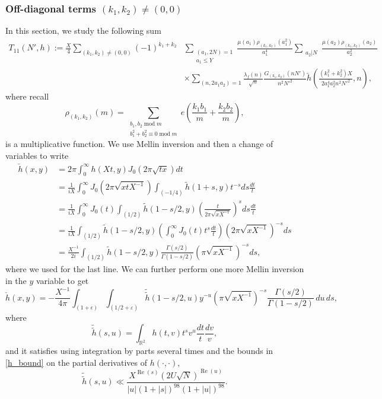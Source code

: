 \documentclass[12pt]{amsart}
\def\R{\mathbb R}
\def\R{\mathbb R}
\def\Re{\operatorname{Re}}
\def\mod{\operatorname{mod}}
\begin{document}
\subsubsection{Off-diagonal terms $(k_1,k_2)\not= (0,0)$}
In this section, we study the following sum
\begin{align*}
    T_{11}(N',h) :=\frac{X}{4}\sum_{(k_1,k_2)\not=(0,0)} (-1)^{k_1+k_2}&\sum_{\substack{(a_1,2N)=1\\a_1\leq Y}}\frac{\mu(a_1) \rho_{(k_1,k_2)}(a_1^2)}{a_1^4}\sum_{\substack{a_2|N}}\frac{\mu(a_2)\rho_{(k_1,k_2)}(a_2)}{a_2^2}\\
    &\times \sum_{(n,2a_1a_2)= 1}\frac{\lambda_f(n)} {\sqrt{n}} \frac{G_{(k_1,k_2)}(nN')}{n^2N'^2} \check{h}\left( \frac{(k_1^2+k_2^2)X}{2a_1^4a_2^2n^2N'^2} ,  n \right),
\end{align*}
where recall
$$ \rho_{(k_1,k_2)}(m)= \sum_{\substack{b_1,b_2 \mod m \\ b_1^2+b_2^2\equiv 0 \mod m}} e \left( \frac{k_1b_1}{m} + \frac{k_2 b_2}{m} \right), $$
is a multiplicative function.
We use Mellin inversion and then a change of variables to write
\begin{align*}
\check{h}(x,y) &= 2\pi \int_{0}^{\infty} h(X t,y) J_0(2\pi\sqrt{tx}) dt \\
&= \frac{1}{iX} \int_0^{\infty} J_0(2\pi \sqrt{xtX^{-1}}) \int_{(-1/4)} \tilde{h}(1+s,y) t^{-s} ds \frac{dt}{t} \\
&=\frac{1}{iX} \int_{0}^{\infty} J_0(t) \int_{(1/2)} \tilde{h}(1-s/2,y) \left( \frac{t}{2\pi \sqrt{xX^{-1}}}\right)^{s} ds \frac{dt}{t} \\
&=\frac{1}{iX} \int_{(1/2)}\tilde{h}(1-s/2,y) \left( \int_{0}^{\infty} J_0(t) t^s \frac{dt}{t} \right) (2\pi \sqrt{xX^{-1}})^{-s} ds \\
&=\frac{X^{-1}}{2i} \int_{(1/2)} \tilde{h}(1-s/2, y) \frac{\Gamma(s/2)}{\Gamma(1-s/2)} (\pi \sqrt{xX^{-1}})^{-s}ds,
\end{align*}
where we used \cite[(17.43.16)]{MR1773820} for the last line. We can further perform one more Mellin inversion in the $y$ variable to get
$$ \check{h}(x,y) = -\frac{X^{-1}}{4\pi} \int_{(1+\epsilon)} \int_{(1/2+\varepsilon)} \tilde{\tilde{h}}(1-s/2,u) y^{-u} (\pi \sqrt{x X^{-1}})^{-s} \frac{\Gamma(s/2)}{\Gamma(1-s/2)} \,du\, ds , $$
where
$$ \tilde{\tilde{h}}(s,u)= \int_{\R^2} h(t,v) t^s v^u \frac{dt}{t} \frac{dv}{v}, $$
and it satisfies using integration by parts several times and the bounds in \eqref{h_bound} on the partial derivatives of $h(\cdot , \cdot )$,
\begin{equation}\label{DoubleMellinbounds}
\tilde{\tilde{h}}(s,u) \ll \frac{X^{\Re(s)} (2U\sqrt{N})^{\Re(u)}}{|u| (1+|s|)^{98} (1+|u|)^{98}} .
\end{equation}
 
\end{document}
